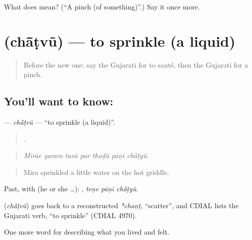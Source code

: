 \begin{tcolorbox}[breakable,colback=teal!4,colframe=teal!35!black,title={Before you move on}]
What does  mean? (\textquotedblleft{}A pinch (of something)\textquotedblright{}.) Say it once more.
\end{tcolorbox}
\section[\texorpdfstring{\gu{છાંટવું} (chā̃ṭvũ)}{છાંટવું (chā̃ṭvũ)}]{ (chā̃ṭvũ) — to sprinkle (a liquid)}

\label{lesson:GU-C520-chatvu}



\begin{quote}
Before the new one: say the Gujarati for to sauté, then the Gujarati for a pinch.
\end{quote}

\subsection*{You'll want to know: }
\textbf{} — \emph{chā̃ṭvũ} — \textquotedblleft{}to sprinkle (a liquid)\textquotedblright{}.

\begin{quote}
      .
\end{quote}

\begin{quote}
\emph{Mīrāe garam tavā par thoḍũ pāṇī chā̃ṭyũ.}
\end{quote}

\begin{quote}
Mira sprinkled a little water on the hot griddle.
\end{quote}

Past, with  (he or she …):   , \emph{teṇe pāṇī chā̃ṭyũ}.

\begin{cousinweb}
\textbf{} (\emph{chā̃ṭvũ}) goes back to a reconstructed \emph{*chaṇṭ}, \textquotedblleft{}scatter\textquotedblright{}, and CDIAL lists the Gujarati verb, \textquotedblleft{}to sprinkle\textquotedblright{} (CDIAL 4970).
\end{cousinweb}

\begin{grammarlens}[title={What you've built}]
One more word for describing what you lived and felt.
\end{grammarlens}

